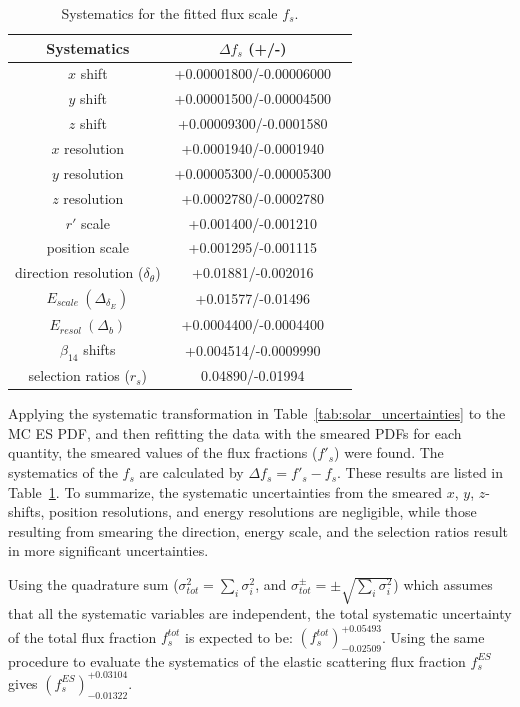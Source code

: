 \begin{table}[ht]
	\centering
	\caption{Systematics for the fitted flux scale $f_s$.\label{tab:smearingResults}}
					\vspace{1mm}
	\begin{tabular*}{90mm}{c@{\extracolsep{\fill}}cc}
		\toprule
		Systematics & $\Delta f_s$ (+/-)\\
		\midrule
		$x$ shift & +0.00001800/-0.00006000\\	
		$y$ shift & +0.00001500/-0.00004500\\
		$z$ shift & +0.00009300/-0.0001580\\
		$x$ resolution & +0.0001940/-0.0001940\\	
		$y$ resolution & +0.00005300/-0.00005300\\
		$z$ resolution & +0.0002780/-0.0002780\\
		$r'$ scale & +0.001400/-0.001210\\
		position scale & +0.001295/-0.001115\\	
		direction resolution ($\delta_\theta$)  &+0.01881/-0.002016\\		
		$E_{scale}~(\Delta_{\delta_E})$ & +0.01577/-0.01496\\
		$E_{resol}~(\Delta_b)$ & +0.0004400/-0.0004400 \\
		$\beta_{14}$ shifts & +0.004514/-0.0009990\\
		selection ratios ($r_s$) & 0.04890/-0.01994\\
		\bottomrule
	\end{tabular*}
\end{table}

Applying the systematic transformation in Table~\ref{tab:solar_uncertainties} to the MC ES PDF, and then refitting the data with the smeared PDFs for each quantity, the smeared values of the flux fractions ($f'_s$) were found. The systematics of the $f_s$ are calculated by $\Delta f_s =f'_s-f_s$. These results are listed in Table~\ref{tab:smearingResults}. To summarize, the systematic uncertainties from the smeared $x$, $y$, $z$-shifts, position resolutions, and energy resolutions are negligible, while those resulting from smearing the direction, energy scale, and the selection ratios result in more significant uncertainties. 

Using the quadrature sum ($\sigma^2_{tot}=\sum_i \sigma^2_i$, and $\sigma_{tot}^\pm=\pm\sqrt{\sum_i \sigma^2_i}$) which assumes that all the systematic variables are independent, the total systematic uncertainty of the total flux fraction $f^{tot}_s$ is expected to be: $({f^{tot}_s})^{+0.05493}_{-0.02509}$. Using the same procedure to evaluate the systematics of the elastic scattering flux fraction $f^{ES}_s$ gives $({f^{ES}_s})^{+0.03104}_{-0.01322}$.

